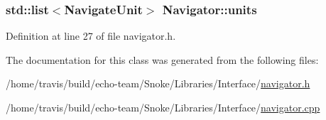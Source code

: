 \hypertarget{class_navigator_ad830f88cb2d1b38f7ff49797e244892d}{
\subsubsection[{units}]{\setlength{\rightskip}{0pt plus 5cm}std\-::list$<${\bf Navigate\-Unit}$>$ Navigator\-::units\hspace{0.3cm}{\ttfamily [private]}}}\label{class_navigator_ad830f88cb2d1b38f7ff49797e244892d}


Definition at line 27 of file navigator.\-h.



The documentation for this class was generated from the following files\-:\begin{DoxyCompactItemize}
\item 
/home/travis/build/echo-\/team/\-Snoke/\-Libraries/\-Interface/\hyperlink{navigator_8h}{navigator.\-h}\item 
/home/travis/build/echo-\/team/\-Snoke/\-Libraries/\-Interface/\hyperlink{navigator_8cpp}{navigator.\-cpp}\end{DoxyCompactItemize}
